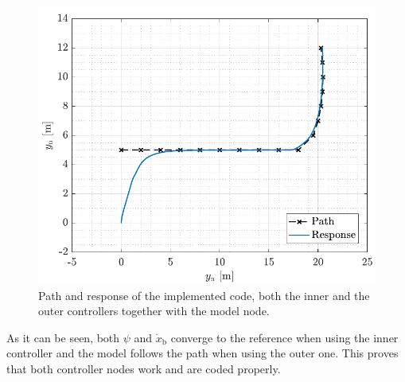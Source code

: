\begin{figure}[H]
    \includegraphics[width=.45\textwidth]{figures/model_node_path}
    \caption{Path and response of the implemented code, both the inner and the outer controllers together with the model node.}
    \label{fig:model_node_path}
\end{figure}

As it can be seen, both $\psi$ and $\dot{x}_\mathrm{b}$ converge to the reference when using the inner controller and the model follows the path when using the outer one. This proves that both controller nodes work and are coded properly.